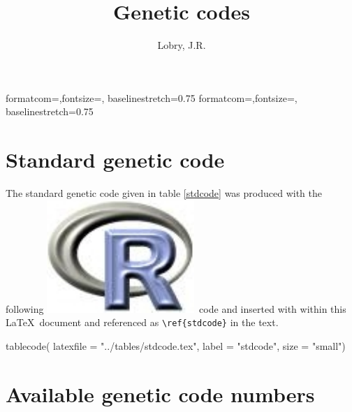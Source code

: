 \documentclass{article}
\title{Genetic codes}
\author{Lobry, J.R.}
\begin{document}

%
%
{formatcom={\color{Sinput}},fontsize=\footnotesize, baselinestretch=0.75}
{formatcom={\color{Soutput}},fontsize=\footnotesize, baselinestretch=0.75}
%
%
\renewenvironment{Schunk}{\vspace{\topsep}}{\vspace{\topsep}}
%
%
\newcommand{\Rlogo}{\protect\includegraphics[height=1.8ex,keepaspectratio]{../figs/Rlogo.pdf}}
%
%
\newcommand{\seqinr}{\texttt{seqin\bf{R}}}
\newcommand{\Seqinr}{\texttt{Seqin\bf{R}}}
%
%
%
%
%


\maketitle

\section{Standard genetic code}

The standard genetic code given in table \ref{stdcode} was produced with the
following \Rlogo{}~code and inserted with \verb||
within this \LaTeX~document and referenced as \verb|\ref{stdcode}| in
the text.

\begin{Schunk}
\begin{Sinput}
 tablecode( latexfile = "../tables/stdcode.tex",
 label = "stdcode", size = "small")
\end{Sinput}
\end{Schunk}



\section{Available genetic code numbers}
\end{document}
